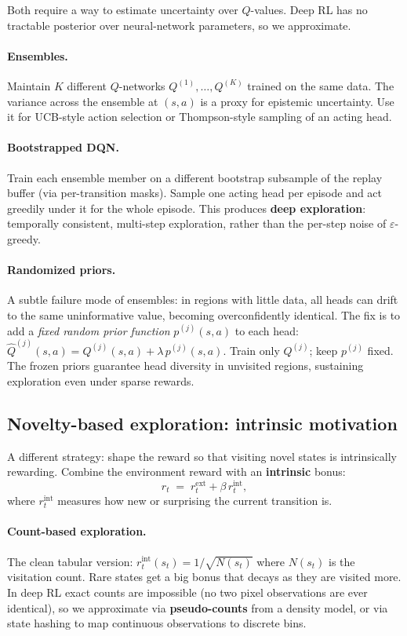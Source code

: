 \documentclass[11pt, oneside]{book}
\begin{document}
Both require a way to estimate uncertainty over $Q$-values. Deep RL has no tractable
posterior over neural-network parameters, so we approximate.

\paragraph{Ensembles.}
Maintain $K$ different $Q$-networks $Q^{(1)}, \dots, Q^{(K)}$ trained on the same data.
The variance across the ensemble at $(s,a)$ is a proxy for epistemic uncertainty.
Use it for UCB-style action selection or Thompson-style sampling of an acting head.

\paragraph{Bootstrapped DQN.}
Train each ensemble member on a different bootstrap subsample of the replay buffer
(via per-transition masks). Sample one acting head per episode and act greedily under
it for the whole episode. This produces \textbf{deep exploration}: temporally
consistent, multi-step exploration, rather than the per-step noise of $\varepsilon$-greedy.

\paragraph{Randomized priors.}
A subtle failure mode of ensembles: in regions with little data, all heads can drift to
the same uninformative value, becoming overconfidently identical. The fix is to add a
\emph{fixed random prior function} $p^{(j)}(s,a)$ to each head:
$\hat Q^{(j)}(s,a) = Q^{(j)}(s,a) + \lambda\, p^{(j)}(s,a)$.
Train only $Q^{(j)}$; keep $p^{(j)}$ fixed. The frozen priors guarantee head diversity
in unvisited regions, sustaining exploration even under sparse rewards.

\subsection{Novelty-based exploration: intrinsic motivation}

A different strategy: shape the reward so that visiting novel states is intrinsically
rewarding. Combine the environment reward with an \textbf{intrinsic} bonus:
\[
  r_t \;=\; r_t^{\text{ext}} + \beta\, r_t^{\text{int}},
\]
where $r_t^{\text{int}}$ measures how new or surprising the current transition is.

\paragraph{Count-based exploration.}
The clean tabular version: $r_t^{\text{int}}(s_t) = 1 / \sqrt{N(s_t)}$ where $N(s_t)$ is
the visitation count. Rare states get a big bonus that decays as they are visited
more.
In deep RL exact counts are impossible (no two pixel observations are ever identical),
so we approximate via \textbf{pseudo-counts} from a density model, or via state hashing
to map continuous observations to discrete bins.
\end{document}
